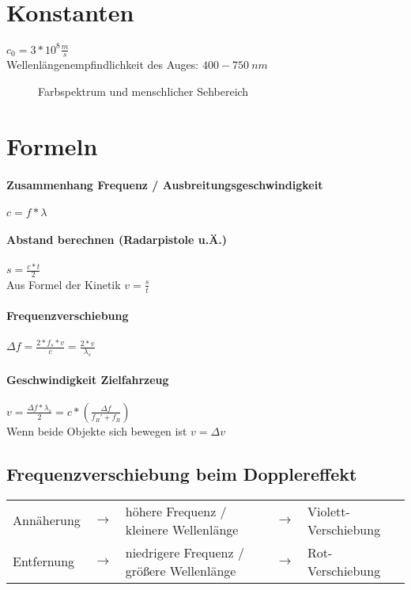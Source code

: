 \documentclass[a4paper, 12pt]{scrreprt}
\begin{document}
\section{Konstanten}
\(c_0 = 3*10^8\frac{m}{s}\)\\[1em]
\textcolor{myred}{Wellenlängenempfindlichkeit des Auges:} \(400 - 750\ nm\)\\

\begin{figure}[H]
  \centering
  
  \caption[Farbspektrum]{Farbspektrum und menschlicher Sehbereich}
  \label{fig:Spektrum}
\end{figure}

\section{Formeln}
\paragraph{Zusammenhang Frequenz / Ausbreitungsgeschwindigkeit} \dotfill \(c = f * \lambda\)
\paragraph{Abstand berechnen (Radarpistole u.Ä.)} \dotfill \(s = \frac{c * t}{2}\)\\
\myhspace \textcolor{myred}{Aus Formel der Kinetik \(v = \frac{s}{t}\)}
\paragraph{Frequenzverschiebung} \dotfill \(\Delta f = \frac{2 * f_s * v}{c} = \frac{2 * v}{\lambda_s}\)
\paragraph{Geschwindigkeit Zielfahrzeug} \dotfill \(v = \frac{\Delta f * \lambda_s}{2} = c * \left( \frac{\Delta f}{f_R'+f_R} \right) \)\\
\myhspace\textcolor{myred}{Wenn beide Objekte sich bewegen ist \(v = \Delta v\)}

\subsection*{Frequenzverschiebung beim Dopplereffekt}

\begin{framed}
  \textcolor{myred}{
    \begin{tabular}[h]{lclcl}
    Annäherung & $\rightarrow$ & höhere Frequenz / kleinere Wellenlänge & $\rightarrow$ & Violett-Verschiebung\\ 
    Entfernung & $\rightarrow$ & niedrigere Frequenz / größere Wellenlänge & $\rightarrow$ & Rot-Verschiebung
    \end{tabular}
  }
\end{framed}
\end{document}
